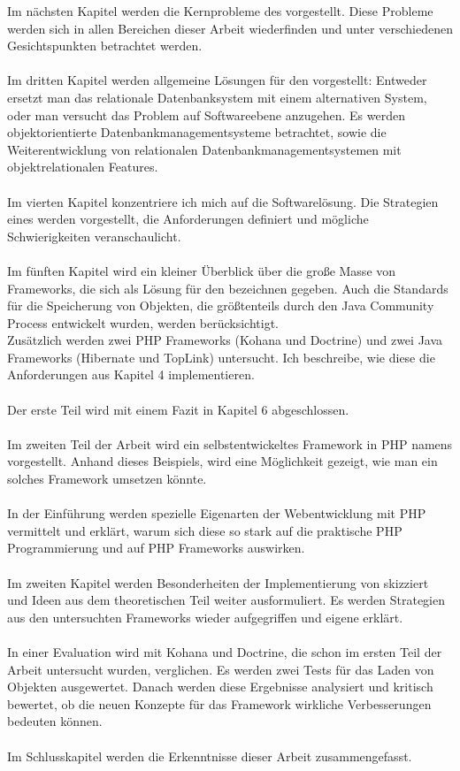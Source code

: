 Im nächsten Kapitel werden die Kernprobleme des  vorgestellt. Diese Probleme werden sich in allen Bereichen dieser Arbeit wiederfinden und unter verschiedenen Gesichtspunkten betrachtet werden. \\
\\
Im dritten Kapitel werden allgemeine Lösungen für den \IM vorgestellt: Entweder ersetzt man das relationale Datenbanksystem mit einem alternativen System, oder man versucht das Problem auf Softwareebene anzugehen. Es werden objektorientierte Datenbankmanagementsysteme betrachtet, sowie die Weiterentwicklung von relationalen Datenbankmanagementsystemen mit objektrelationalen Features.\\
\\
Im vierten Kapitel konzentriere ich mich auf die Softwarelösung. Die Strategien eines  werden vorgestellt, die Anforderungen definiert und mögliche Schwierigkeiten veranschaulicht. \\
\\
Im fünften Kapitel wird ein kleiner Überblick über die große Masse von Frameworks, die sich als Lösung für den \IM bezeichnen gegeben. Auch die Standards für die Speicherung von Objekten, die größtenteils durch den Java Community Process entwickelt wurden, werden berücksichtigt. \\
Zusätzlich werden zwei PHP Frameworks (Kohana und Doctrine) und zwei Java Frameworks (Hibernate und TopLink) untersucht. Ich beschreibe, wie diese die Anforderungen aus Kapitel 4 implementieren. \\
\\
Der erste Teil wird mit einem Fazit in Kapitel 6 abgeschlossen. \\
\\
Im zweiten Teil der Arbeit wird ein selbstentwickeltes Framework in PHP namens \PSCORM vorgestellt. Anhand dieses Beispiels, wird eine Möglichkeit gezeigt, wie man ein solches Framework umsetzen könnte. \\
\\
In der Einführung werden spezielle Eigenarten der Webentwicklung mit PHP vermittelt und erklärt, warum sich diese so stark auf die praktische PHP Programmierung und auf PHP Frameworks auswirken. \\
\\
Im zweiten Kapitel werden Besonderheiten der Implementierung von \PSCORM skizziert und Ideen aus dem theoretischen Teil weiter ausformuliert. Es werden Strategien aus den untersuchten Frameworks wieder aufgegriffen und eigene erklärt. \\
\\
In einer Evaluation wird \PSCORM mit Kohana und Doctrine, die schon im ersten Teil der Arbeit untersucht wurden, verglichen. Es werden zwei Tests für das Laden von Objekten ausgewertet. Danach werden diese Ergebnisse analysiert und kritisch bewertet, ob die neuen Konzepte für das Framework wirkliche Verbesserungen bedeuten können. \\
\\
Im Schlusskapitel werden die Erkenntnisse dieser Arbeit zusammengefasst.
